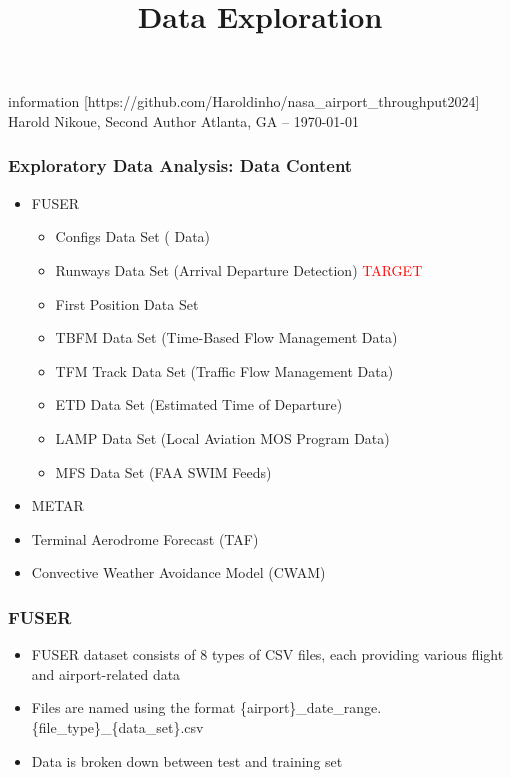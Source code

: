 \documentclass[11pt,xcolor={dvipsnames},hyperref={pdftex,pdfpagemode=UseNone,hidelinks,pdfdisplaydoctitle=true},usepdftitle=false]{beamer}
\begin{document}
\title{Data Exploration}
information
%
[https://github.com/Haroldinho/nasa\_airport\_throughput2024]
%
{Harold Nikoue, Second Author}
%
{Atlanta, GA -- \today}

\frame{\titlepage}

\begin{frame}
\frametitle{Exploratory Data Analysis: Data Content}
\begin{itemize}
	\item FUSER
	\begin{itemize}
		\item Configs Data Set ( Data)
		\item Runways Data Set (Arrival Departure Detection) \textcolor{red}{TARGET}
		\item First Position Data Set 
		\item TBFM Data Set (Time-Based Flow Management Data)
		\item TFM Track Data Set (Traffic Flow Management Data)
		\item ETD Data Set (Estimated Time of Departure)
		\item LAMP Data Set (Local Aviation MOS Program Data)
		\item MFS Data Set (FAA SWIM Feeds)
	\end{itemize}
	\item METAR
	\item Terminal Aerodrome Forecast (TAF)
	\item Convective Weather Avoidance Model (CWAM)
\end{itemize}
\end{frame}

\begin{frame}
\frametitle{FUSER}
\begin{itemize}
	\item FUSER dataset consists of 8 types of CSV files, each providing various flight and airport-related data
	\item Files are named using the format \{airport\}\_date\_range.\{file\_type\}\_\{data\_set\}.csv
	\item Data is broken down between test and training set
	
\end{itemize}
\end{frame}
\end{document}
